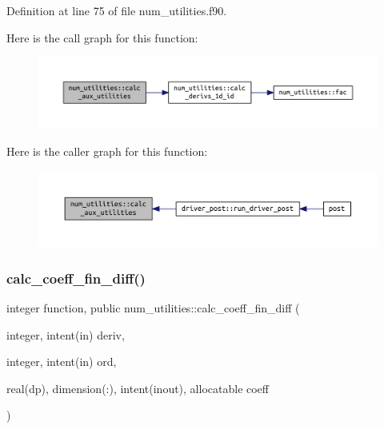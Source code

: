 Definition at line 75 of file num\+\_\+utilities.\+f90.

Here is the call graph for this function\+:
\nopagebreak
\begin{figure}[H]
\begin{center}
\leavevmode
\includegraphics[width=350pt]{namespacenum__utilities_af461ae4c95a7a45da875dcf311e323f5_cgraph}
\end{center}
\end{figure}
Here is the caller graph for this function\+:
\nopagebreak
\begin{figure}[H]
\begin{center}
\leavevmode
\includegraphics[width=350pt]{namespacenum__utilities_af461ae4c95a7a45da875dcf311e323f5_icgraph}
\end{center}
\end{figure}
\mbox{\label{namespacenum__utilities_a87132bd5006387bcc2afe5ca375f0830}} 
\subsubsection{\texorpdfstring{calc\+\_\+coeff\+\_\+fin\+\_\+diff()}{calc\_coeff\_fin\_diff()}}
{\footnotesize\ttfamily integer function, public num\+\_\+utilities\+::calc\+\_\+coeff\+\_\+fin\+\_\+diff (\begin{DoxyParamCaption}\item[{integer, intent(in)}]{deriv,  }\item[{integer, intent(in)}]{ord,  }\item[{real(dp), dimension(\+:), intent(inout), allocatable}]{coeff }\end{DoxyParamCaption})}



